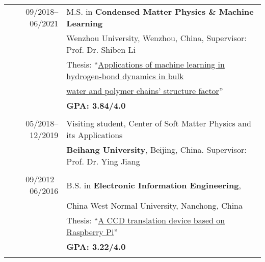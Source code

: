 \documentclass[a4paper,10pt]{article} %
\begin{document}
\begin{tabular}{r|l}	
09/2018--06/2021 				    & M.S. in \textbf{Condensed Matter Physics \& Machine Learning}\\
                                    & Wenzhou University, Wenzhou, China, Supervisor: Prof. Dr. Shiben Li\\
                                    & Thesis: “\href{https://nbviewer.jupyter.org/github/HuangJiaLian/DataBase0/blob/master/uPic/2021_07_24_12_HuangJieBiYeDaBian.pdf}{Applications of machine learning in hydrogen-bond dynamics in bulk} \\& \href{https://nbviewer.jupyter.org/github/HuangJiaLian/DataBase0/blob/master/uPic/2021_07_24_12_HuangJieBiYeDaBian.pdf}{water and polymer chains’ structure factor}”\\
                                    & \textbf{GPA: 3.84/4.0}\\

\multicolumn{2}{c}{} \\	%

	05/2018--12/2019            & Visiting student, Center of Soft Matter Physics and its Applications\\ & \textbf{Beihang University}, Beijing, China. Supervisor: Prof. Dr. Ying Jiang  \\


\multicolumn{2}{c}{} \\	%

09/2012--06/2016                    & B.S. in \textbf{Electronic Information Engineering}, \\                    & China West Normal University, Nanchong, China\\
					 & Thesis: “\href{https://nbviewer.jupyter.org/github/HuangJiaLian/DataBase0/blob/master/uPic/2021_07_24_13_CCD_translation_device.pdf}{A CCD translation device based on Raspberry Pi}”	\\
					 & \textbf{GPA: 3.22/4.0}\\
\multicolumn{2}{c}{} \\	%
\end{tabular}

%	
%
\end{document}
